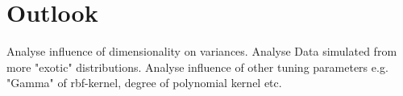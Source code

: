 \documentclass[letterpaper]{article}
\begin{document}
\section{Outlook}


Analyse influence of dimensionality on variances. Analyse Data simulated from more "exotic" distributions. Analyse influence of other tuning parameters e.g. "Gamma" of rbf-kernel, degree of polynomial kernel etc.




\footnotesize


\end{document}
